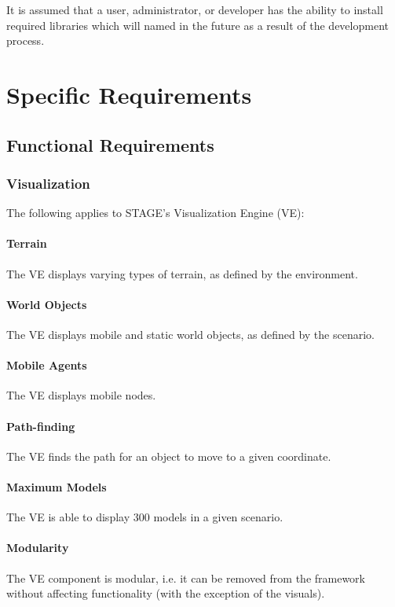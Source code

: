 \documentclass[titlepage]{article}
\begin{document}
It is assumed that a user, administrator, or developer has the ability to install required libraries which will named in the future as a result of the development process.


\section{Specific Requirements%
  \label{specific-requirements}%
}

\subsection{Functional Requirements%
    \label{functional}%
}

\subsubsection{Visualization}
The following applies to STAGE's Visualization Engine (VE):
    \paragraph{Terrain} The VE displays varying types of terrain, as defined by the environment.
    \paragraph{World Objects} The VE displays mobile and static world objects, as defined by the scenario.
    \paragraph{Mobile Agents} The VE displays mobile nodes.
    \paragraph{Path-finding} The VE finds the path for an object to move to a given coordinate.
    \paragraph{Maximum Models} The VE is able to display 300 models in a given scenario.
    \paragraph{Modularity} The VE component is modular, i.e. it can be removed from the framework without affecting functionality (with the exception of the visuals).
\end{document}
